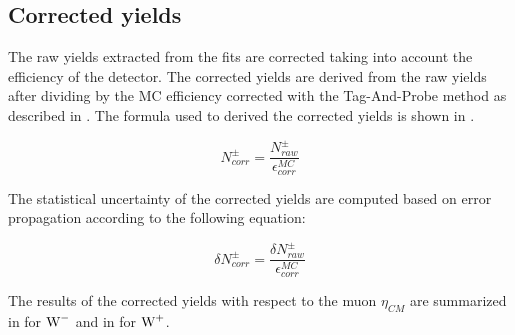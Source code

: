 

\subsection{Corrected yields}\label{sec:WBoson_SignalExtraction_CorrectedYields}

The raw yields extracted from the fits are corrected taking into account the efficiency of the detector. The corrected yields are derived from the raw yields after dividing by the MC efficiency corrected with the Tag-And-Probe method as described in . The formula used to derived the corrected yields is shown in .

\begin{equation}
N^{\pm}_{corr} = \frac{N^{\pm}_{raw}}{\epsilon^{MC}_{corr}}
\label{eq:CorrectedYield}
\end{equation}

The statistical uncertainty of the corrected yields are computed based on error propagation according to the following equation:

\begin{equation}
\delta{N^{\pm}_{corr}} = \frac{\delta{N^{\pm}_{raw}}}{\epsilon^{MC}_{corr}}
\label{eq:CorrectedYieldStatError}
\end{equation}

The results of the corrected yields with respect to the muon $\eta_{CM}$ are summarized in  for $\text{W}^{-}$ and in  for $\text{W}^{+}$.



\clearpage


